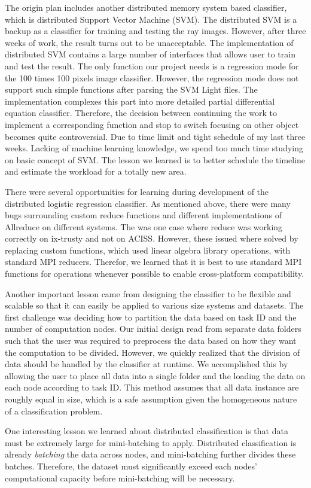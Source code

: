 The origin plan includes another distributed memory system based classifier, which is distributed Support Vector Machine (SVM). The distributed SVM is a backup as a classifier for training and testing the ray images. However, after three weeks of work, the result turns out to be unacceptable. The implementation of distributed SVM contains a large number of interfaces that allows user to train and test the result. The only function our project needs is a regression mode for the 100 times 100 pixels image classifier. However, the regression mode does not support such simple functions after parsing the SVM Light files. The implementation complexes this part into more detailed partial differential equation classifier. Therefore, the decision between continuing the work to implement a corresponding function and stop to switch focusing on other object becomes quite controversial. Due to time limit and tight schedule of my last three weeks. Lacking of machine learning knowledge, we spend too much time studying on basic concept of SVM. The lesson we learned is to better schedule the timeline and estimate the workload for a totally new area.

There were several opportunities for learning during development of the distributed logistic regression classifier.  As mentioned above, there were many bugs surrounding custom reduce functions and different implementations of Allreduce on different systems.  The was one case where reduce was working correctly on ix-trusty and not on ACISS.  However, these issued where solved by replacing custom functions, which used linear algebra library operations, with standard MPI reducers.  Therefor, we learned that it is best to use standard MPI functions for operations whenever possible to enable cross-platform compatibility.

Another important lesson came from designing the classifier to be flexible and scalable so that it can easily be applied to various size systems and datasets.  The first challenge was deciding how to partition the data based on task ID and the number of computation nodes.  Our initial design read from separate data folders such that the user was required to preprocess the data based on how they want the computation to be divided.  However, we quickly realized that the division of data should be handled by the classifier at runtime.  We accomplished this by allowing the user to place all data into a single folder and the loading the data on each node according to task ID.  This method assumes that all data instance are roughly equal in size, which is a safe assumption given the homogeneous nature of a classification problem.

One interesting lesson we learned about distributed classification is that data must be extremely large for mini-batching to apply.  Distributed classification is already \emph{batching} the data across nodes, and mini-batching further divides these batches.  Therefore, the dataset must significantly exceed each nodes' computational capacity before mini-batching will be necessary.
